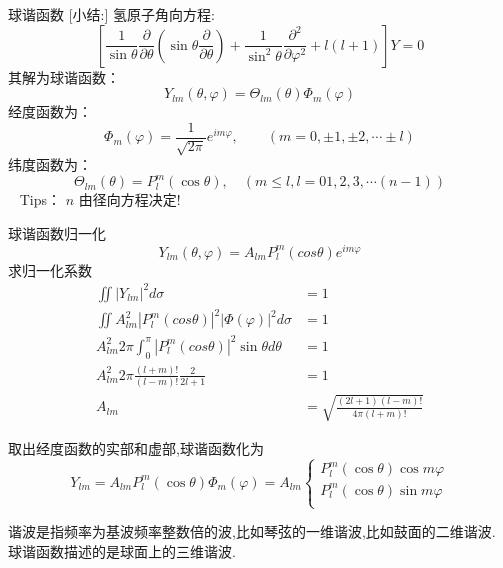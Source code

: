 	{球谐函数}
	[小结:]
	氢原子角向方程:
	\begin{equation*}
		\left[ \frac{1}{ \sin \theta  } \frac{\partial }{\partial \theta } (\sin \theta \frac{\partial }{\partial \theta } )
		+\frac{1}{ \sin^2 \theta  } \frac{\partial^2}{\partial\varphi ^2} +l(l+1)\right] Y=0
	\end{equation*}	
	其解为球谐函数：
	\begin{equation*}
		Y_{lm}(\theta,\varphi)= \Theta_{lm}(\theta) \Phi_m (\varphi)
	\end{equation*}	
	经度函数为：
	\begin{equation*}
		\Phi_m (\varphi)=\frac{1}{\sqrt{2\pi}} e^{im\varphi}, \qquad (m=0,\pm 1, \pm 2, \cdots \pm l)
	\end{equation*}
	纬度函数为：
	\begin{equation*}
		\Theta_{lm}(\theta)= P^m  _{l}(\cos \theta) ,  \quad(m \le l, l=0 1,2,3, \cdots (n-1))
	\end{equation*}	 
	Tips： $n$ 由径向方程决定!
	


	{球谐函数归一化}
	\begin{equation*}
		Y_{lm} (\theta,\varphi)= A_{lm}  P_l ^m (cos \theta)  e^{im\varphi} 
	\end{equation*}	
	求归一化系数
	\begin{equation*}
	\begin{split}
	 	\iint  |Y_{lm}| ^2  d \sigma & =1  \\
	 	\iint  A^2_{lm}  |P_l ^m (cos \theta)|^2  |\Phi (\varphi)|^2 d \sigma  & =1  \\
        A^2_{lm} 2\pi  \int_{0}^{\pi}    |P_l ^m (cos \theta)|^2  \sin \theta d\theta &=1 \\
        A^2_{lm}  2\pi  \frac{(l+m)!}{(l-m)!}  \frac{2}{2l+1}  &=1 \\
        A_{lm} &= \sqrt{\frac{(2l+1)(l-m)!}{4\pi (l+m)!}}
	\end{split}		
	\end{equation*}	 
	


	取出经度函数的实部和虚部,球谐函数化为
	\[Y_{lm}=A_{lm} P^m _l(\cos\theta) \Phi_m (\varphi)=A_{lm}\begin{cases}
		 P^m _l(\cos\theta) \cos m \varphi\\
		 P^m _l(\cos\theta) \sin m \varphi\\
	\end{cases}\]
	\begin{enumerate}
		\IItem 谐波是指频率为基波频率整数倍的波,比如琴弦的一维谐波,比如鼓面的二维谐波. 球谐函数描述的是球面上的三维谐波.\\
	\end{enumerate}	
	


